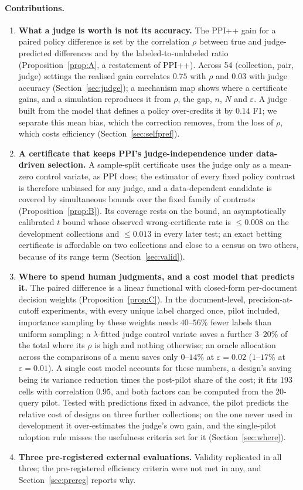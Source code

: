 \documentclass{article}
\newcommand{\eps}{\varepsilon}
\begin{document}
\paragraph{Contributions.}
\begin{enumerate}
\item \textbf{What a judge is worth is not its accuracy.} The PPI++ gain for a paired policy difference is set by the correlation $\rho$ between true and judge-predicted differences and by the labeled-to-unlabeled ratio (Proposition~\ref{prop:A}, a restatement of PPI++). Across 54 (collection, pair, judge) settings the realised gain correlates $0.75$ with $\rho$ and $0.03$ with judge accuracy (Section~\ref{sec:judge}); a mechanism map shows where a certificate gains, and a simulation reproduces it from $\rho$, the gap, $n$, $N$ and $\eps$. A judge built from the model that defines a policy over-credits it by $0.14$ F1; we separate this mean bias, which the correction removes, from the loss of $\rho$, which costs efficiency (Section~\ref{sec:selfpref}).
\item \textbf{A certificate that keeps PPI's judge-independence under data-driven selection.} A sample-split certificate uses the judge only as a mean-zero control variate, as PPI does; the estimator of every fixed policy contrast is therefore unbiased for any judge, and a data-dependent candidate is covered by simultaneous bounds over the fixed family of contrasts (Proposition~\ref{prop:B}). Its coverage rests on the bound, an asymptotically calibrated $t$ bound whose observed wrong-certificate rate is $\le0.008$ on the development collections and $\le0.013$ in every later test; an exact betting certificate is affordable on two collections and close to a census on two others, because of its range term (Section~\ref{sec:valid}).
\item \textbf{Where to spend human judgments, and a cost model that predicts it.} The paired difference is a linear functional with closed-form per-document decision weights (Proposition~\ref{prop:C}). In the document-level, precision-at-cutoff experiments, with every unique label charged once, pilot included, importance sampling by these weights needs $40$--$56\%$ fewer labels than uniform sampling; a $\lambda$-fitted judge control variate saves a further $3$--$20\%$ of the total where its $\rho$ is high and nothing otherwise; an oracle allocation across the comparisons of a menu saves only $0$--$14\%$ at $\eps=0.02$ ($1$--$17\%$ at $\eps=0.01$). A single cost model accounts for these numbers, a design's saving being its variance reduction times the post-pilot share of the cost; it fits 193 cells with correlation $0.95$, and both factors can be computed from the 20-query pilot. Tested with predictions fixed in advance, the pilot predicts the relative cost of designs on three further collections; on the one never used in development it over-estimates the judge's own gain, and the single-pilot adoption rule misses the usefulness criteria set for it (Section~\ref{sec:where}).
\item \textbf{Three pre-registered external evaluations.} Validity replicated in all three; the pre-registered efficiency criteria were not met in any, and Section~\ref{sec:prereg} reports why.
\end{enumerate}
\end{document}
